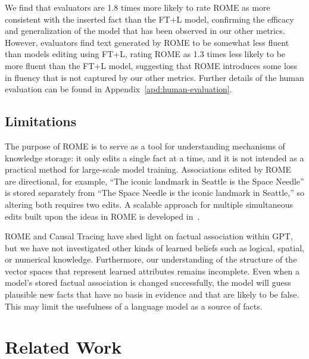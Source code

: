 \documentclass{article}
\begin{document}
We find that evaluators are 1.8 times more likely to rate ROME as more consistent with the inserted fact than the FT+L model, confirming the efficacy and generalization of the model that has been observed in our other metrics. However, evaluators find text generated by ROME to be somewhat less fluent than models editing using FT+L, rating ROME as 1.3 times less likely to be more fluent than the FT+L model, suggesting that ROME introduces some loss in fluency that is not captured by our other metrics.  Further details of the human evaluation can be found in Appendix~\ref{apd:human-evaluation}.


\subsection{Limitations}

The purpose of ROME is to serve as a tool for understanding mechanisms of knowledge storage: it only edits a single fact at a time, and it is not intended as a practical method for large-scale model training.  Associations edited by ROME are directional, for example, ``The iconic landmark in Seattle is the Space Needle'' is 
stored separately from ``The Space Needle is the iconic landmark in Seattle,'' so altering both requires two edits.  A scalable approach for multiple simultaneous edits built upon the ideas in ROME is developed in~\citet*{meng2022memit}.

ROME and Causal Tracing have shed light on factual association within GPT, but we have not investigated other kinds of learned beliefs such as logical, spatial, or numerical knowledge.  Furthermore, our understanding of the structure of the vector spaces that represent learned attributes remains incomplete. Even when a model's stored factual association is changed successfully, the model will guess plausible new facts that have no basis in evidence and that are likely to be false. This may limit the usefulness of a language model as a source of facts.






\section{Related Work}
\end{document}

